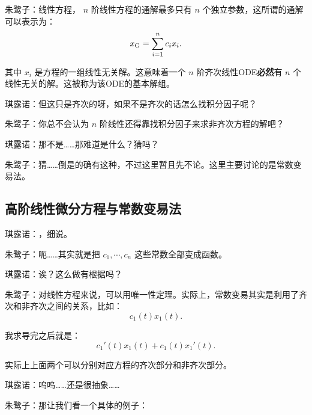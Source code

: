 朱鹭子：线性方程， \(n\) 阶线性方程的通解最多只有 \(n\) 个独立参数，这所谓的通解可以表示为：
\[
	x_{\rm G}=\sum_{i=1}^{n} c_i x_i
	.\]

其中 \(x_i\) 是方程的一组线性无关解。这意味着一个 \(n\) 阶齐次线性ODE\textbf{必然}有 \(n\) 个线性无关的解。这被称为该ODE的基本解组。

琪露诺：但这只是齐次的呀，如果不是齐次的话怎么找积分因子呢？

朱鹭子：你总不会认为 \(n\) 阶线性还得靠找积分因子来求非齐次方程的解吧？

琪露诺：那不是……那难道是什么？猜吗？

朱鹭子：猜……倒是的确有这种，不过这里暂且先不论。这里主要讨论的是常数变易法。


\subsection{高阶线性微分方程与常数变易法}
琪露诺：，细说。

朱鹭子：呃……其实就是把 \(c_1,\cdots ,c_n\) 这些常数全部变成函数。

琪露诺：诶？这么做有根据吗？

朱鹭子：对线性方程来说，可以用唯一性定理。实际上，常数变易其实是利用了齐次和非齐次之间的关系，比如：
\[
	c_1(t)x_1(t)
	.\]

我求导完之后就是：
\[
	c_1'(t)x_1(t)+c_1(t)x_1'(t)
	.\]

实际上上面两个可以分别对应方程的齐次部分和非齐次部分。

琪露诺：呜呜……还是很抽象……

朱鹭子：那让我们看一个具体的例子：

